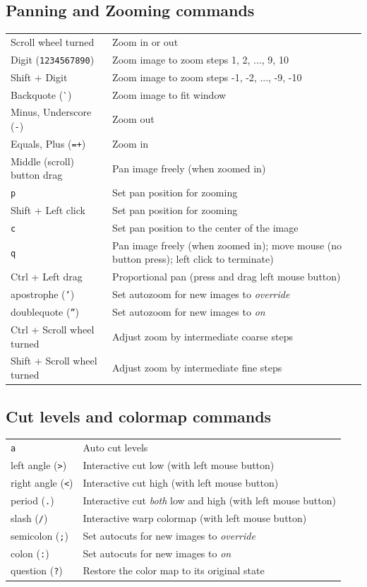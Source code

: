 \documentclass[11pt]{report}
\begin{document}
\subsection{Panning and Zooming commands}
\begin{tabularx}{\textwidth}{lX}
Scroll wheel turned & Zoom in or out \\
Digit ({\tt 1234567890}) & Zoom image to zoom steps 1, 2, ..., 9, 10 \\
Shift + Digit & Zoom image to zoom steps -1, -2, ..., -9, -10 \\
Backquote (\`{}) & Zoom image to fit window \\
Minus, Underscore ({\tt -\textunderscore{}}) & Zoom out \\
Equals, Plus ({\tt =+}) & Zoom in \\
Middle (scroll) button drag & Pan image freely (when zoomed in) \\
{\tt p} & Set pan position for zooming \\
Shift + Left click & Set pan position for zooming \\
{\tt c} & Set pan position to the center of the image \\
{\tt q} & Pan image freely (when zoomed in); move mouse (no button press); left click to terminate) \\
Ctrl + Left drag & Proportional pan (press and drag left mouse button) \\
apostrophe ({\tt '}) & Set autozoom for new images to {\em override} \\
doublequote ({\tt ''}) & Set autozoom for new images to {\em on} \\
Ctrl + Scroll wheel turned & Adjust zoom by intermediate coarse steps \\
Shift + Scroll wheel turned & Adjust zoom by intermediate fine steps \\
\end{tabularx}

\subsection{Cut levels and colormap commands}
\begin{tabularx}{\textwidth}{lX}
{\tt a} & Auto cut levels \\
left angle ({\tt \textgreater{}}) & Interactive cut low (with left mouse button) \\ 
right angle ({\tt \textless{}}) & Interactive cut high (with left mouse button) \\ 
period ({\tt .}) & Interactive cut \emph{both} low and high (with left mouse button) \\ 
slash ({\tt /}) & Interactive warp colormap (with left mouse button) \\
semicolon ({\tt ;}) & Set autocuts for new images to {\em override} \\
colon ({\tt :}) & Set autocuts for new images to {\em on} \\
question ({\tt ?}) & Restore the color map to its original state \\
\end{tabularx}
\end{document}
